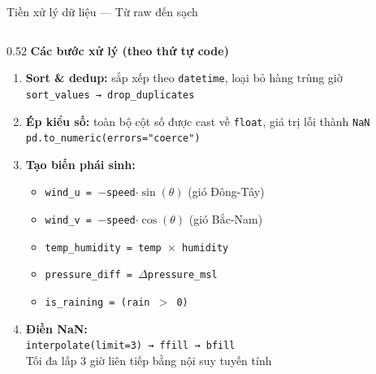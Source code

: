 \documentclass[aspectratio=169]{beamer}
\begin{document}
\begin{frame}{Tiền xử lý dữ liệu --- Từ raw đến sạch}

  \begin{columns}[T]
    \begin{column}{0.52\textwidth}
      \textbf{Các bước xử lý (theo thứ tự code)}
      \begin{enumerate}\small
        \item \textbf{Sort \& dedup:} sắp xếp theo \texttt{datetime}, loại bỏ hàng trùng giờ\\
              \texttt{sort\_values → drop\_duplicates}

        \item \textbf{Ép kiểu số:} toàn bộ cột số được cast về \texttt{float}, giá trị lỗi thành \texttt{NaN}\\
              \texttt{pd.to\_numeric(errors="coerce")}

        \item \textbf{Tạo biến phái sinh:}
          \begin{itemize}\small
            \item \texttt{wind\_u = $-$speed$\cdot\sin(\theta)$} \quad (gió Đông-Tây)
            \item \texttt{wind\_v = $-$speed$\cdot\cos(\theta)$} \quad (gió Bắc-Nam)
            \item \texttt{temp\_humidity = temp $\times$ humidity}
            \item \texttt{pressure\_diff = $\Delta$pressure\_msl}
            \item \texttt{is\_raining = (rain $>$ 0)}
          \end{itemize}

        \item \textbf{Điền NaN:}\\
              \texttt{interpolate(limit=3) → ffill → bfill}\\
              \small Tối đa lấp 3 giờ liên tiếp bằng nội suy tuyến tính


\end{enumerate}
\end{column}
\end{columns}
\end{frame}
\end{document}
